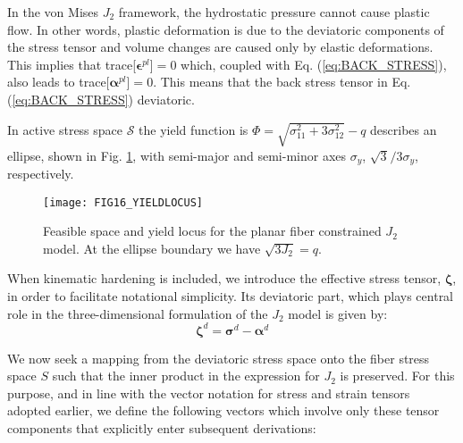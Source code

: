 In the von Mises $J_2$ framework, the hydrostatic pressure cannot cause plastic
flow.
In other words, plastic deformation is due to the deviatoric components of the 
stress tensor and volume changes are caused only by elastic deformations. This
implies that trace[$\bm{\epsilon}^{pl}$]$=0$ which, coupled with Eq.
(\ref{eq:BACK_STRESS}), also leads to trace[$\bm{\alpha}^{pl}$]$=0$. This means 
that
the back stress tensor in Eq. (\ref{eq:BACK_STRESS}) deviatoric.

In active stress space $\mathcal{S}$ the yield function is 
$\Phi = \sqrt{\sigma_{11}^2 + 3\sigma_{12}^2}-q$ describes an ellipse, shown
in Fig. \ref{fig:FIG16_YIELDLOCUS}, with
semi-major and semi-minor axes $\sigma_y$, $\sqrt{3}^{}/3\sigma_y$, 
respectively.

\begin{figure}[t]
	\centering
	\texttt{[image: FIG16\_YIELDLOCUS]}
	\caption{Feasible space and yield locus for the planar fiber constrained 
	$J_2$ model. At the ellipse boundary we have $\sqrt{3J_2}=q$.}
	\label{fig:FIG16_YIELDLOCUS}
\end{figure}

When kinematic
hardening is included, we introduce the effective stress tensor, 
$\bm{\zeta}$, in order to facilitate notational simplicity. Its deviatoric 
part, 
which plays central role in the three-dimensional formulation of the $J_2$ 
model is given by:
\begin{equation}
	\bm{\zeta}^d =	\bm{\sigma}^d-\bm{\alpha}^d
	\label{eq:EFFECTIVE_STRESS}
\end{equation}

We now seek a mapping from the deviatoric stress space onto the fiber stress 
space $S$ such that the inner product in the expression for $J_2$ is preserved. 
For this purpose, and in line with the vector notation for stress and strain 
tensors adopted earlier, we define the following vectors which involve only 
these tensor components that explicitly enter subsequent derivations:


